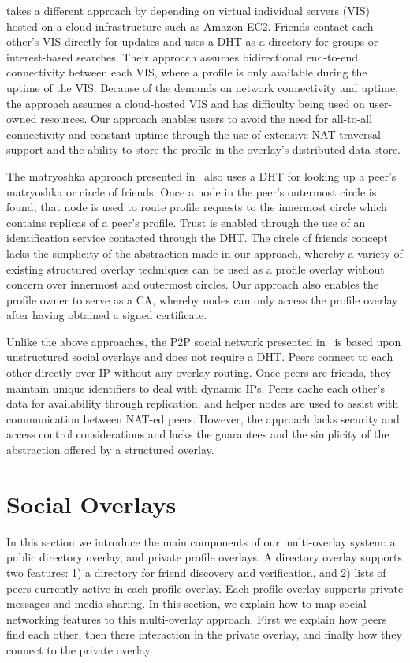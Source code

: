 \documentclass[letterpaper,twocolumn,10pt]{article}
\begin{document}
\cite{vis-a-vis} takes a different approach by depending on virtual individual
servers (VIS) hosted on a cloud infrastructure such as Amazon EC2. Friends
contact each other's VIS directly for updates and uses a DHT as a directory for
groups or interest-based searches. Their approach assumes bidirectional
end-to-end connectivity between each VIS, where a profile is only available
during the uptime of the VIS.  Because of the demands on network connectivity
and uptime, the approach assumes a cloud-hosted VIS and has difficulty being used on user-owned resources.
Our approach enables users to avoid the need for all-to-all connectivity and
constant uptime through the use of extensive NAT traversal support and the
ability to store the profile in the overlay's distributed data store.

The matryoshka approach presented in~\cite{matryoshka} also uses a DHT for
looking up a peer's matryoshka or circle of friends. Once a node in the peer's
outermost circle is found, that node is used to route profile requests to the
innermost circle which contains replicas of a peer's profile. Trust is enabled
through the use of an identification service contacted through the DHT.  The
circle of friends concept lacks the simplicity of the abstraction made in our
approach, whereby a variety of existing structured overlay techniques can be used as a profile
overlay without concern over innermost and outermost circles.  Our approach
also enables the profile owner to serve as a CA, whereby nodes can only access
the profile overlay after having obtained a signed certificate.

Unlike the above approaches, the P2P social network presented in~\cite{tribler-osn}
is based upon unstructured social overlays and does not require a DHT.  Peers
connect to each other directly over IP without any overlay routing. Once peers
are friends, they maintain unique identifiers to deal with dynamic IPs.  Peers
cache each other's data for availability through replication, and helper nodes
are used to assist with communication between NAT-ed peers.  However, the approach lacks
security and access control considerations and lacks the guarantees and the
simplicity of the abstraction offered by a structured overlay.

\section{Social Overlays}
\label{social_overlays}
In this section we introduce the main components of our multi-overlay system:
a public directory overlay, and private profile overlays.  A directory
overlay supports two features:  1) a directory for friend discovery and
verification, and 2) lists of peers currently active in each profile overlay.
Each profile overlay supports private messages and
media sharing.  In this section, we explain how to map social networking
features to this multi-overlay approach.  First we explain how peers find
each other, then there interaction in the private overlay, and finally how
they connect to the private overlay.
\end{document}
